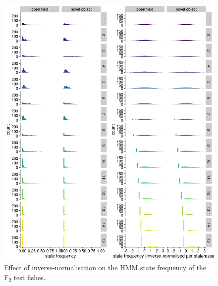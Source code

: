 \documentclass[
]{book}
\begin{document}
\begin{figure}
\includegraphics[width=1\linewidth]{figs/mikk_behaviour/0.08_15_state_freq_F2_dge} \caption{Effect of inverse-normalisation on the HMM state frequency of the F\textsubscript{2} test fishes.}\label{fig:F2-state-freq-dge}
\end{figure}
\end{document}
